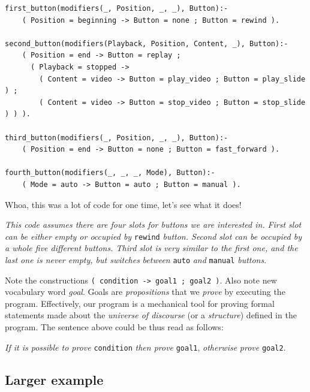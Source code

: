 \documentclass[11pt]{article}
\begin{document}
\begin{verbatim}
first_button(modifiers(_, Position, _, _), Button):-
    ( Position = beginning -> Button = none ; Button = rewind ).

second_button(modifiers(Playback, Position, Content, _), Button):-
    ( Position = end -> Button = replay ;
      ( Playback = stopped ->
        ( Content = video -> Button = play_video ; Button = play_slide ) ;
        ( Content = video -> Button = stop_video ; Button = stop_slide ) ) ).

third_button(modifiers(_, Position, _, _), Button):-
    ( Position = end -> Button = none ; Button = fast_forward ).

fourth_button(modifiers(_, _, _, Mode), Button):-
    ( Mode = auto -> Button = auto ; Button = manual ).
\end{verbatim}

Whoa, this was a lot of code for one time, let's see what it does!

\emph{This code assumes there are four slots for buttons we are interested in.}
\emph{First slot can be either empty or occupied by} \texttt{rewind} \emph{button.  Second}
\emph{slot can be occupied by a whole five different buttons.  Third slot is}
\emph{very similar to the first one, and the last one is never empty, but switches}
\emph{between} \texttt{auto} \emph{and} \texttt{manual} \emph{buttons}.

Note the constructions \texttt{( condition -> goal1 ; goal2 )}. Also note new
vocabulary word \emph{goal}.  Goals are \emph{propositions} that we \emph{prove} by executing
the program.  Effectively, our program is a mechanical tool for proving formal
statements made about the \emph{universe of discourse} (or a \emph{structure}) defined
in the program.  The sentence above could be thus read as follows:

\emph{If it is possible to prove} \texttt{condition} \emph{then prove} \texttt{goal1}, \emph{otherwise}
\emph{prove} \texttt{goal2}.
\subsection{Larger example}
\label{sec-2-3}
\end{document}
